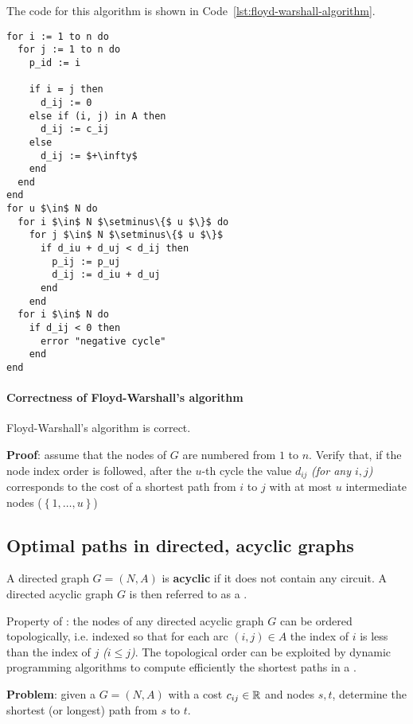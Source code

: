 \documentclass[english]{article}
\begin{document}
\bigskip
The code for this algorithm is shown in Code~\ref{lst:floyd-warshall-algorithm}.

\begin{lstlisting}[style=custom, language=pseudocode, caption={Floyd-Warshall's algorithm}, label={lst:floyd-warshall-algorithm}]
for i := 1 to n do
  for j := 1 to n do
    p_id := i

    if i = j then
      d_ij := 0
    else if (i, j) in A then
      d_ij := c_ij
    else
      d_ij := $+\infty$
    end
  end
end
for u $\in$ N do
  for i $\in$ N $\setminus\{$ u $\}$ do
    for j $\in$ N $\setminus\{$ u $\}$
      if d_iu + d_uj < d_ij then
        p_ij := p_uj
        d_ij := d_iu + d_uj
      end
    end
  for i $\in$ N do
    if d_ij < 0 then
      error "negative cycle"
    end
end
\end{lstlisting}

\paragraph{Correctness of Floyd-Warshall's algorithm}

Floyd-Warshall's algorithm is correct.

\textbf{Proof}: assume that the nodes of \(G\) are numbered from \(1\) to \(n\).
Verify that, if the node index order is followed, after the \(u\)-th cycle the value \(d_{ij}\) \textit{(for any \(i, j\))} corresponds to the cost of a shortest path from \(i\) to \(j\) with at most \(u\) intermediate nodes (\(\left\{ 1, \ldots, u \right\}\))

\subsection{Optimal paths in directed, acyclic graphs}

A directed graph \(G = (N, A)\) is \textbf{acyclic} if it does not contain any circuit.
A directed acyclic graph \(G\) is then referred to as a \textbf{\DAG}.

Property of \textit{\DAGs}: the nodes of any directed acyclic graph \(G\) can be ordered topologically, i.e. indexed so that for each arc \((i, j) \in A\) the index of \(i\) is less than the index of \(j\) \textit{(\(i \leq j\))}.
The topological order can be exploited by dynamic programming algorithms to compute efficiently the shortest paths in a \DAG.

\textbf{Problem}: given a \DAG \(G = (N, A)\) with a cost \(c_{ij} \in \mathbb{R}\) and nodes \(s, t\), determine the shortest (or longest) path from \(s\) to \(t\).
\end{document}
